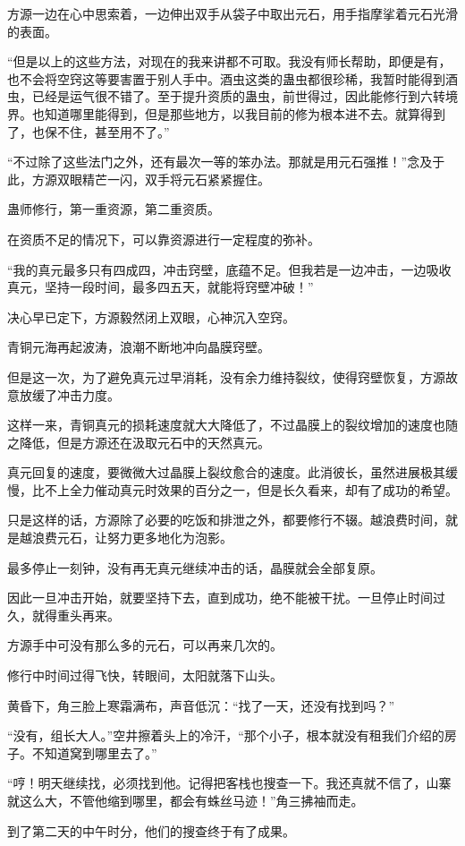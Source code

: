 \begin{this_body}
方源一边在心中思索着，一边伸出双手从袋子中取出元石，用手指摩挲着元石光滑的表面。

“但是以上的这些方法，对现在的我来讲都不可取。我没有师长帮助，即便是有，也不会将空窍这等要害置于别人手中。酒虫这类的蛊虫都很珍稀，我暂时能得到酒虫，已经是运气很不错了。至于提升资质的蛊虫，前世得过，因此能修行到六转境界。也知道哪里能得到，但是那些地方，以我目前的修为根本进不去。就算得到了，也保不住，甚至用不了。”

“不过除了这些法门之外，还有最次一等的笨办法。那就是用元石强推！”念及于此，方源双眼精芒一闪，双手将元石紧紧握住。

蛊师修行，第一重资源，第二重资质。

在资质不足的情况下，可以靠资源进行一定程度的弥补。

“我的真元最多只有四成四，冲击窍壁，底蕴不足。但我若是一边冲击，一边吸收真元，坚持一段时间，最多四五天，就能将窍壁冲破！”

决心早已定下，方源毅然闭上双眼，心神沉入空窍。

青铜元海再起波涛，浪潮不断地冲向晶膜窍壁。

但是这一次，为了避免真元过早消耗，没有余力维持裂纹，使得窍壁恢复，方源故意放缓了冲击力度。

这样一来，青铜真元的损耗速度就大大降低了，不过晶膜上的裂纹增加的速度也随之降低，但是方源还在汲取元石中的天然真元。

真元回复的速度，要微微大过晶膜上裂纹愈合的速度。此消彼长，虽然进展极其缓慢，比不上全力催动真元时效果的百分之一，但是长久看来，却有了成功的希望。

只是这样的话，方源除了必要的吃饭和排泄之外，都要修行不辍。越浪费时间，就是越浪费元石，让努力更多地化为泡影。

最多停止一刻钟，没有再无真元继续冲击的话，晶膜就会全部复原。

因此一旦冲击开始，就要坚持下去，直到成功，绝不能被干扰。一旦停止时间过久，就得重头再来。

方源手中可没有那么多的元石，可以再来几次的。

修行中时间过得飞快，转眼间，太阳就落下山头。

黄昏下，角三脸上寒霜满布，声音低沉：“找了一天，还没有找到吗？”

“没有，组长大人。”空井擦着头上的冷汗，“那个小子，根本就没有租我们介绍的房子。不知道窝到哪里去了。”

“哼！明天继续找，必须找到他。记得把客栈也搜查一下。我还真就不信了，山寨就这么大，不管他缩到哪里，都会有蛛丝马迹！”角三拂袖而走。

到了第二天的中午时分，他们的搜查终于有了成果。


\end{this_body}
